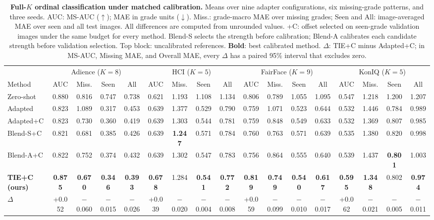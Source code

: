 \begin{table}[t]
\centering
\caption{\textbf{Full-$K$ ordinal classification under matched calibration.}
Means over nine adapter configurations, six missing-grade patterns, and three seeds.
AUC: MS-AUC ($\uparrow$); MAE in grade units ($\downarrow$).
Miss.: grade-macro MAE over missing grades;
Seen and All: image-averaged MAE over seen and all test images.
All differences are computed from unrounded values.
+C: offset selected on seen-grade validation images under the same budget for every method.
Blend-S selects the strength before calibration; Blend-A calibrates each candidate strength before validation selection.
Top block: uncalibrated references.
\textbf{Bold}: best calibrated method.
$\Delta$: TIE+C minus Adapted+C; in MS-AUC, Missing MAE, and Overall MAE, every $\Delta$ has a paired 95\% interval that excludes zero.}
\label{tab:main}
\footnotesize
\setlength{\tabcolsep}{1.5pt}
\begin{tabular*}{\textwidth}{@{\extracolsep{\fill}}l*{16}{c}@{}}
\toprule
& \multicolumn{4}{c}{Adience ($K{=}8$)}
& \multicolumn{4}{c}{HCI ($K{=}5$)}
& \multicolumn{4}{c}{FairFace ($K{=}9$)}
& \multicolumn{4}{c}{KonIQ ($K{=}5$)} \\
\cmidrule(lr){2-5}
\cmidrule(lr){6-9}
\cmidrule(lr){10-13}
\cmidrule(l){14-17}
Method
& AUC & Miss. & Seen & All
& AUC & Miss. & Seen & All
& AUC & Miss. & Seen & All
& AUC & Miss. & Seen & All \\
\midrule
Zero-shot
& 0.880 & 0.816 & 0.747 & 0.738
& 0.621 & 1.193 & 1.108 & 1.134
& 0.806 & 0.789 & 1.055 & 1.095
& 0.547 & 1.218 & 1.200 & 1.207 \\
Adapted
& 0.823 & 1.089 & 0.317 & 0.453
& 0.639 & 1.377 & 0.529 & 0.790
& 0.759 & 1.071 & 0.523 & 0.644
& 0.532 & 1.446 & 0.784 & 0.989 \\
\midrule
Adapted+C
& 0.823 & 0.730 & 0.360 & 0.419
& 0.639 & 1.303 & 0.544 & 0.781
& 0.759 & 0.848 & 0.549 & 0.633
& 0.532 & 1.369 & 0.807 & 0.985 \\
Blend-S+C
& 0.821 & 0.681 & 0.385 & 0.426
& 0.639 & \textbf{1.247} & 0.571 & 0.784
& 0.760 & 0.763 & 0.571 & 0.639
& 0.535 & 1.380 & 0.820 & 0.998 \\
Blend-A+C
& 0.822 & 0.752 & 0.374 & 0.432
& 0.639 & 1.302 & 0.547 & 0.783
& 0.756 & 0.864 & 0.555 & 0.640
& 0.539 & 1.437 & \textbf{0.801} & 1.003 \\
\textbf{TIE+C (ours)}
& \textbf{0.875} & \textbf{0.670}
& \textbf{0.346} & \textbf{0.393}
& \textbf{0.678} & 1.284
& \textbf{0.541} & \textbf{0.772}
& \textbf{0.819} & \textbf{0.749}
& \textbf{0.540} & \textbf{0.617}
& \textbf{0.595} & \textbf{1.348}
& 0.802 & \textbf{0.974} \\
\midrule
$\Delta$
& +0.052 & $-$0.060 & $-$0.015 & $-$0.026
& +0.039 & $-$0.020 & $-$0.004 & $-$0.008
& +0.059 & $-$0.099 & $-$0.010 & $-$0.017
& +0.062 & $-$0.021 & $-$0.005 & $-$0.011 \\
\bottomrule
\end{tabular*}
\end{table}

